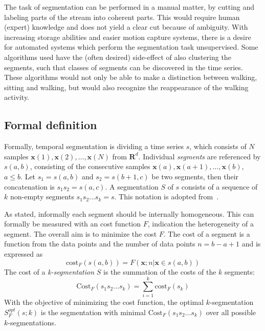 The task of segmentation can be performed in a manual matter, by cutting and labeling parts of the stream into coherent parts.
This would require human (expert) knowledge and does not yield a clear cut because of ambiguity.
With increasing storage abilities and easier motion capture systems, there is a desire for automated systems which perform the segmentation task unsupervised.
Some algorithms used have the (often desired) side-effect of also clustering the segments, such that classes of segments can be discovered in the time series.
These algorithms would not only be able to make a distinction between walking, sitting and walking, but would also recognize the reappearance of the walking activity.

\subsection{Formal definition}
Formally, temporal segmentation is dividing a time series $s$, which consists of $N$ samples $\mathbf{x}(1),\mathbf{x}(2),\dots,\mathbf{x}(N)$ from $\mathbf{R}^d$.
Individual \emph{segments} are referenced by $s(a,b)$, consisting of the consecutive samples $\mathbf{x}(a),\mathbf{x}(a+1),\dots,\mathbf{x}(b)$, $a \le b$.
Let $s_1 = s(a,b)$ and $s_2 = s(b+1,c)$ be two segments, then their concatenation is $s_1s_2 = s(a,c)$.
A segmentation $S$ of $s$ consists of a sequence of $k$ non-empty segments $s_1s_2 \dots s_k = s$.
This notation is adopted from~\cite{himberg2001time}.

As stated, informally each segment should be internally homogeneous.
This can formally be measured with an cost function $F$, indication the heterogeneity of a segment.
The overall aim is to minimize the cost $F$. The cost of a segment is a function from the data points and the number of data points
$n = b - a + 1$ and is expressed as
\begin{equation}
	\label{eq:segment_cost}
	\mathrm{cost}_F (s(a,b)) = F(\mathbf{x};n|\mathbf{x} \in s(a,b))
\end{equation}
The cost of a \emph{k-segmentation} $S$ is the summation of the costs of the $k$ segments:
\begin{equation}
	\label{eq:segmentation_cost}
	\mathrm{Cost}_F (s_1 s_2 \dots s_k) = \sum_{i=1}^{k} \mathrm{cost}_F (s_k)
\end{equation}
With the objective of minimizing the cost function, the optimal $k$-segmentation $S_F^\mathit{opt}(s;k)$ is the segmentation with minimal $\mathrm{Cost}_F(s_1 s_2 \dots s_k)$ over all possible $k$-segmentations.

